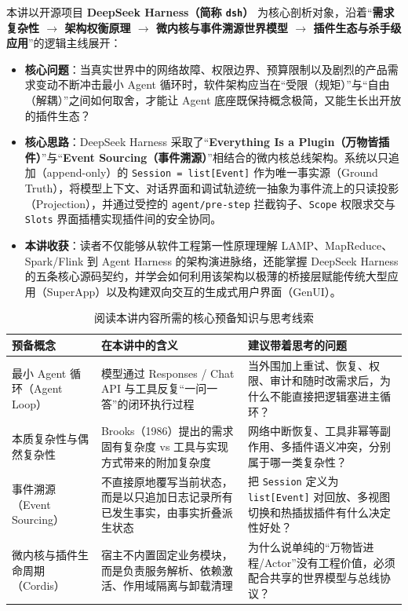 \documentclass[a4paper]{article}
\begin{document}
本讲以开源项目 \textbf{DeepSeek Harness（简称 \texttt{dsh}）} 为核心剖析对象，沿着“\textbf{需求复杂性 $\to$ 架构权衡原理 $\to$ 微内核与事件溯源世界模型 $\to$ 插件生态与杀手级应用}”的逻辑主线展开：
\begin{itemize}
    \item \textbf{核心问题}：当真实世界中的网络故障、权限边界、预算限制以及剧烈的产品需求变动不断冲击最小 Agent 循环时，软件架构应当在“受限（规矩）”与“自由（解耦）”之间如何取舍，才能让 Agent 底座既保持概念极简，又能生长出开放的插件生态？
    \item \textbf{核心思路}：DeepSeek Harness 采取了“\textbf{Everything Is a Plugin（万物皆插件）}”与“\textbf{Event Sourcing（事件溯源）}”相结合的微内核总线架构。系统以只追加（append-only）的 \texttt{Session = list[Event]} 作为唯一事实源（Ground Truth），将模型上下文、对话界面和调试轨迹统一抽象为事件流上的只读投影（Projection），并通过受控的 \texttt{agent/pre-step} 拦截钩子、\texttt{Scope} 权限求交与 \texttt{Slots} 界面插槽实现插件间的安全协同。
    \item \textbf{本讲收获}：读者不仅能够从软件工程第一性原理理解 LAMP、MapReduce、Spark/Flink 到 Agent Harness 的架构演进脉络，还能掌握 DeepSeek Harness 的五条核心源码契约，并学会如何利用该架构以极薄的桥接层赋能传统大型应用（SuperApp）以及构建双向交互的生成式用户界面（GenUI）。
\end{itemize}

\begin{table}[H]
\centering
\small
\begin{tabular}{p{3.4cm}p{5.2cm}p{5.2cm}}
\toprule
\textbf{预备概念} & \textbf{在本讲中的含义} & \textbf{建议带着思考的问题} \\
\midrule
最小 Agent 循环（Agent Loop） & 模型通过 Responses / Chat API 与工具反复“一问一答”的闭环执行过程 & 当外围加上重试、恢复、权限、审计和随时改需求后，为什么不能直接把逻辑塞进主循环？ \\
本质复杂性与偶然复杂性 & Brooks（1986）提出的需求固有复杂度 vs 工具与实现方式带来的附加复杂度 & 网络中断恢复、工具非幂等副作用、多插件语义冲突，分别属于哪一类复杂性？ \\
事件溯源（Event Sourcing） & 不直接原地覆写当前状态，而是以只追加日志记录所有已发生事实，由事实折叠派生状态 & 把 \texttt{Session} 定义为 \texttt{list[Event]} 对回放、多视图切换和热插拔插件有什么决定性好处？ \\
微内核与插件生命周期（Cordis） & 宿主不内置固定业务模块，而是负责服务解析、依赖激活、作用域隔离与卸载清理 & 为什么说单纯的“万物皆进程/Actor”没有工程价值，必须配合共享的世界模型与总线协议？ \\
\bottomrule
\end{tabular}
\caption{阅读本讲内容所需的核心预备知识与思考线索}
\end{table}
\end{document}
